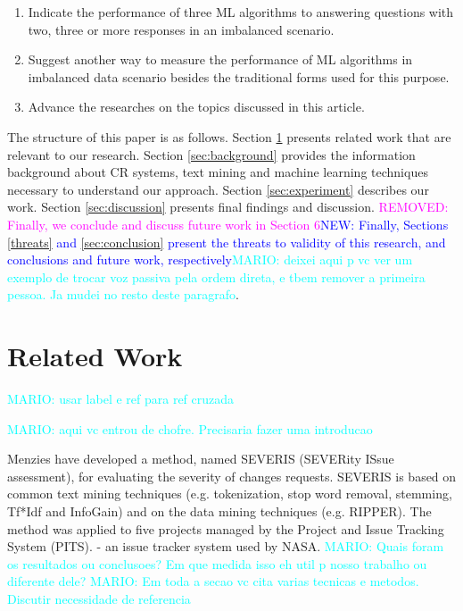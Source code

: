 \documentclass[10pt, conference]{IEEEtran}
\newcommand{\mario}[1]{\noindent\textcolor{cyan}{MARIO: {#1}}}
\newcommand{\rem}[1]{\noindent\textcolor{magenta}{REMOVED: {#1}}}
\newcommand{\new}[1]{\noindent\textcolor{blue}{NEW: {#1}}}
\newcommand{\mario}[1]{}
\newcommand{\rem}[1]{}
\newcommand{\new}[1]{#1}
\begin{document}
\begin{enumerate}
  \item Indicate the performance of three ML algorithms to answering questions with two, three or more responses in an imbalanced scenario.  
  \item Suggest another way to measure the performance of ML algorithms in imbalanced data scenario besides the traditional forms used for this purpose.
  \item Advance the researches on the topics discussed in this article.
\end{enumerate}

The structure of this paper is as follows. Section \ref{sec:relatedwork} presents related work that are relevant to our research. Section \ref{sec:background} provides the information background about CR systems, text mining and machine learning techniques necessary to understand our approach. Section \ref{sec:experiment} describes our work. Section \ref{sec:discussion} presents final findings and discussion. \rem{Finally, we conclude and discuss future work in Section 6}\new{Finally, Sections \ref{threats} and \ref{sec:conclusion} present the threats to validity of this research, and conclusions and  future work, respectively}\mario{deixei aqui p vc ver um exemplo de trocar voz passiva pela ordem direta, e tbem remover a primeira pessoa. Ja mudei no resto deste paragrafo}.


\section{Related Work}\label{sec:relatedwork} \mario{usar label e ref para ref cruzada}

\mario{aqui vc entrou de chofre. Precisaria fazer uma introducao}

Menzies\cite{Menzies2008} have developed a method, named SEVERIS (SEVERity ISsue assessment), for evaluating the severity of changes requests. SEVERIS is based on common text mining techniques (e.g. tokenization, stop word removal, stemming, Tf*Idf and InfoGain) and on the data mining techniques (e.g. RIPPER). The method was applied to five projects managed by the Project and Issue Tracking System (PITS). - an issue tracker system used by NASA. \mario{Quais foram os resultados ou conclusoes? Em que medida isso eh util p nosso trabalho ou diferente dele?} \mario{Em toda a secao vc cita varias tecnicas e metodos. Discutir necessidade de referencia}
\end{document}
